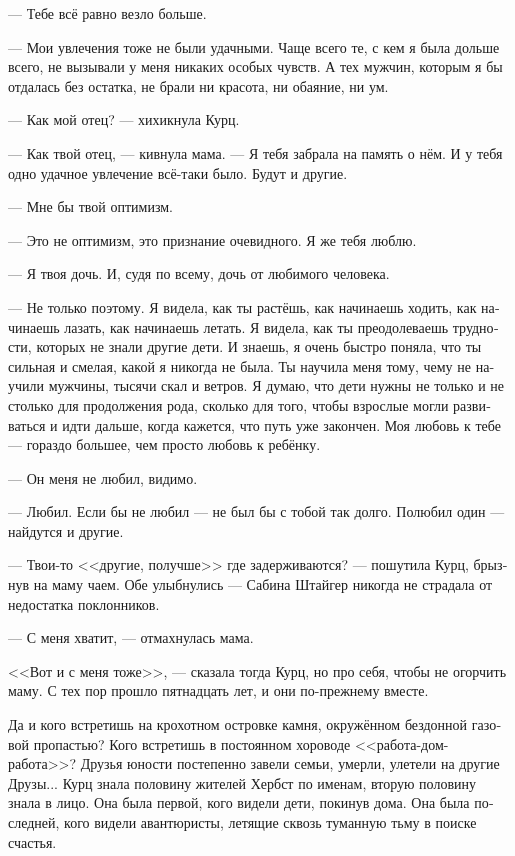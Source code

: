 \documentclass[a4paper,12pt,fleqn]{book}\usepackage{polyglossia}\setdefaultlanguage[babelshorthands=true]{russian}\setotherlanguage{english}\defaultfontfeatures{Ligatures=TeX,Mapping=tex-text}\usepackage{xcolor}\newcommand{\ml}[3]{#2}
\begin{document}
--- Тебе всё равно везло больше.

--- Мои увлечения тоже не были удачными.
Чаще всего те, с кем я была дольше всего, не вызывали у меня никаких особых чувств.
А тех мужчин, которым я бы отдалась без остатка, не брали ни красота, ни обаяние, ни ум.

--- Как мой отец? --- хихикнула Курц.

--- Как твой отец, --- кивнула мама.
--- Я тебя забрала на память о нём.
И у тебя одно удачное увлечение всё-таки было.
Будут и другие.

--- Мне бы твой оптимизм.

--- Это не оптимизм, это признание очевидного.
Я же тебя люблю.

--- Я твоя дочь.
И, судя по всему, дочь от любимого человека.

--- Не только поэтому.
Я видела, как ты растёшь, как начинаешь ходить, как начинаешь лазать, как начинаешь летать.
Я видела, как ты преодолеваешь трудности, которых не знали другие дети.
И знаешь, я очень быстро поняла, что ты сильная и смелая, какой я никогда не была.
Ты научила меня тому, чему не научили мужчины, тысячи скал и ветров.
Я думаю, что дети нужны не только и не столько для продолжения рода, сколько для того, чтобы взрослые могли развиваться и идти дальше, когда кажется, что путь уже закончен.
Моя любовь к тебе --- гораздо большее, чем просто любовь к ребёнку.

--- Он меня не любил, видимо.

--- Любил.
Если бы не любил --- не был бы с тобой так долго.
Полюбил один --- найдутся и другие.

--- Твои-то <<другие, получше>> где задерживаются? --- пошутила Курц, брызнув на маму чаем.
Обе улыбнулись --- Сабина Штайгер никогда не страдала от недостатка поклонников.

--- С меня хватит, --- отмахнулась мама.

<<Вот и с меня тоже>>, --- сказала тогда Курц, но про себя, чтобы не огорчить маму.
С тех пор прошло пятнадцать лет, и они по-прежнему вместе.

Да и кого встретишь на крохотном островке камня, окружённом бездонной газовой пропастью?
Кого встретишь в постоянном хороводе <<работа-дом-работа>>?
Друзья юности постепенно завели семьи, умерли, улетели на другие Друзы...
Курц знала половину жителей Хербст по именам, вторую половину знала в лицо.
Она была первой, кого видели дети, покинув дома.
Она была последней, кого видели авантюристы, летящие сквозь туманную тьму в поиске счастья.
\end{document}
